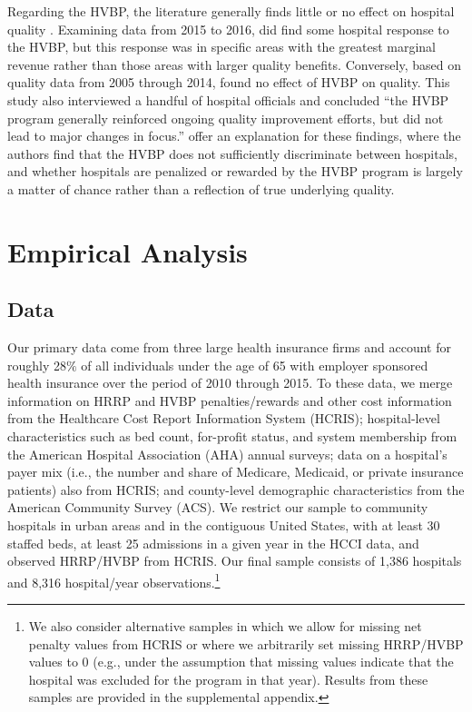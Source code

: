 \documentclass[12pt]{article}
\begin{document}
Regarding the HVBP, the literature generally finds little or no effect on hospital quality \citep{ryan2015,doran2017,norton2017,ryan2017}. Examining data from 2015 to 2016, \cite{norton2017} did find some hospital response to the HVBP, but this response was in specific areas with the greatest marginal revenue rather than those areas with larger quality benefits. Conversely, based on quality data from 2005 through 2014, \cite{gao2015} found no effect of HVBP on quality. This study also interviewed a handful of hospital officials and concluded ``the HVBP program generally reinforced ongoing quality improvement efforts, but did not lead to major changes in focus.'' \cite{friedson2016} offer an explanation for these findings, where the authors find that the HVBP does not sufficiently discriminate between hospitals, and whether hospitals are penalized or rewarded by the HVBP program is largely a matter of chance rather than a reflection of true underlying quality.

\section{Empirical Analysis}
\label{sec:Empirical}

\subsection{Data}
Our primary data come from three large health insurance firms and account for roughly 28$\%$ of all individuals under the age of 65 with employer sponsored health insurance over the period of 2010 through 2015.  To these data, we merge information on HRRP and HVBP penalties/rewards and other cost information from the Healthcare Cost Report Information System (HCRIS); hospital-level characteristics such as bed count, for-profit status, and system membership from the American Hospital Association (AHA) annual surveys; data on a hospital's payer mix (i.e., the number and share of Medicare, Medicaid, or private insurance patients) also from HCRIS; and county-level demographic characteristics from the American Community Survey (ACS).  We restrict our sample to community hospitals in urban areas and in the contiguous United States, with at least 30 staffed beds, at least 25 admissions in a given year in the HCCI data, and observed HRRP/HVBP from HCRIS. Our final sample consists of 1,386 hospitals and 8,316 hospital/year observations.\footnote{We also consider alternative samples in which we allow for missing net penalty values from HCRIS or where we arbitrarily set missing HRRP/HVBP values to 0 (e.g., under the assumption that missing values indicate that the hospital was excluded for the program in that year). Results from these samples are provided in the supplemental appendix.}
\end{document}

